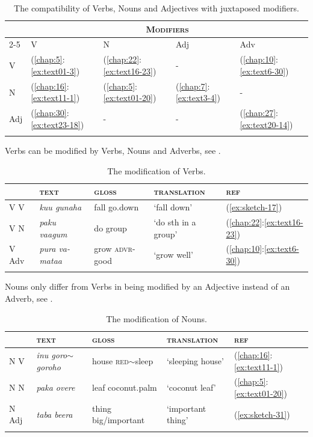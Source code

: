 \documentclass[output=paper]{langscibook}
\begin{document}
\begin{table}
    \caption{The compatibility of Verbs, Nouns and Adjectives with juxtaposed modifiers.} \label{tab:juxtaposed}
\begin{tabularx}{.8\textwidth}{XXXXl}
    \lsptoprule
    &\multicolumn{4}{c}{\textsc{Modifiers}}\\
    \cmidrule{2-5}
    &V&N&Adj&Adv\\
    \midrule
        V&(\ref{chap:5}:\ref{ex:text01-3})&(\ref{chap:22}:\ref{ex:text16-23})&-&(\ref{chap:10}:\ref{ex:text6-30})\\
        N&(\ref{chap:16}:\ref{ex:text11-1})&(\ref{chap:5}:\ref{ex:text01-20})&(\ref{chap:7}:\ref{ex:text3-4})&-\\
        Adj&(\ref{chap:30}:\ref{ex:text23-18})&-&-&(\ref{chap:27}:\ref{ex:text20-14})\\
    \lspbottomrule
\end{tabularx}
\end{table}

Verbs can be modified by Verbs, Nouns and Adverbs, see .

\begin{table}
    \caption{The modification of Verbs.} \label{tab:modverbs}
\begin{tabularx}{\textwidth}{Xllll}
    \lsptoprule
    &\textsc{text}&\textsc{gloss}&\textsc{translation}&\textsc{ref}\\
    \midrule
        V V&\textit{kuu gunaha}&fall go.down&`fall down'&(\ref{ex:sketch-17})\\
        V N&\textit{paku vaagum}&do group&`do sth in a group'&(\ref{chap:22}:\ref{ex:text16-23})\\
        V Adv&\textit{pura va-mataa}&grow \textsc{advr}-good&`grow well'&(\ref{chap:10}:\ref{ex:text6-30})\\
    \lspbottomrule
\end{tabularx}
\end{table}

Nouns only differ from Verbs in being modified by an Adjective instead of an Adverb, see .

\begin{table}
    \caption{The modification of Nouns.} \label{tab:modnouns}
\begin{tabularx}{\textwidth}{Xllll}
    \lsptoprule
    &\textsc{text}&\textsc{gloss}&\textsc{translation}&\textsc{ref}\\
    \midrule
        N V&\textit{inu goro{$\sim$}goroho}&house \textsc{red}{$\sim$}sleep&`sleeping house'&(\ref{chap:16}:\ref{ex:text11-1})\\
        N N&\textit{paka overe }&leaf coconut.palm&`coconut leaf'&(\ref{chap:5}:\ref{ex:text01-20})\\
        N Adj&\textit{taba beera}&thing big/important&`important thing'&(\ref{ex:sketch-31})\\
    \lspbottomrule
\end{tabularx}
\end{table}
\end{document}
